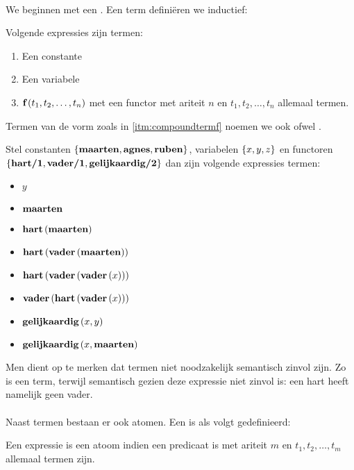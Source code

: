 \paragraph{}
We beginnen met een . Een term defini\"eren we inductief:
\begin{definition}[Term]
Volgende expressies zijn termen:
\begin{enumerate}
 \item Een constante
 \item Een variabele
 \item \label{itm:compoundtermf} $\textbf{\ensuremath{\mbox{f}}}\left( t_1,t_2,\ldots,t_n \right)$ met  een functor met ariteit $n$ en $t_1,t_2,\ldots,t_n$ allemaal termen.
\end{enumerate}
Termen van de vorm zoals in \ref{itm:compoundtermf} noemen we ook  ofwel .
\end{definition}
\begin{example}
Stel constanten $\left\{ \textbf{\ensuremath{\mbox{maarten}}},\textbf{\ensuremath{\mbox{agnes}}},\textbf{\ensuremath{\mbox{ruben}}} \right\}$, variabelen $\left\{ x,y,z \right\}$ en functoren $\left\{ \textbf{\ensuremath{\mbox{hart/1}}}, \textbf{\ensuremath{\mbox{vader/1}}}, \textbf{\ensuremath{\mbox{gelijkaardig/2}}} \right\}$ dan zijn volgende expressies termen:
\begin{multicols}{2}
\begin{itemize}
 \item $y$
 \item $\textbf{\ensuremath{\mbox{maarten}}}$
 \item $\textbf{\ensuremath{\mbox{hart}}}\left( \textbf{\ensuremath{\mbox{maarten}}} \right)$
 \item $\textbf{\ensuremath{\mbox{hart}}}\left( \textbf{\ensuremath{\mbox{vader}}}\left( \textbf{\ensuremath{\mbox{maarten}}} \right) \right)$
 \item $\textbf{\ensuremath{\mbox{hart}}}\left( \textbf{\ensuremath{\mbox{vader}}}\left( \textbf{\ensuremath{\mbox{vader}}}\left( x \right) \right) \right)$
 \item $\textbf{\ensuremath{\mbox{vader}}}\left( \textbf{\ensuremath{\mbox{hart}}}\left( \textbf{\ensuremath{\mbox{vader}}}\left( x \right) \right) \right)$
 \item $\textbf{\ensuremath{\mbox{gelijkaardig}}}\left( x,y \right)$
 \item $\textbf{\ensuremath{\mbox{gelijkaardig}}}\left( x,\textbf{\ensuremath{\mbox{maarten}}} \right)$
\end{itemize}
\end{multicols}
\end{example}
Men dient op te merken dat termen niet noodzakelijk semantisch zinvol zijn. Zo is  een term, terwijl semantisch gezien deze expressie niet zinvol is: een hart heeft namelijk geen vader.
\paragraph{}
Naast termen bestaan er ook atomen. Een  is als volgt gedefinieerd:
\begin{definition}[Atoom]
Een expressie  is een atoom indien  een predicaat is met ariteit $m$ en $t_1,t_2,\ldots,t_m$ allemaal termen zijn.
\end{definition}
